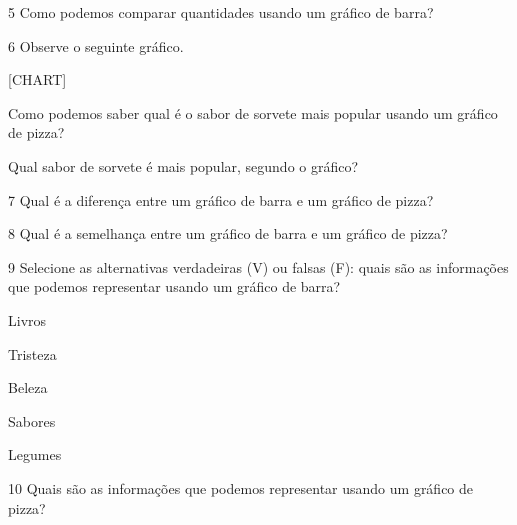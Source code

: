 

\num{5} Como podemos comparar quantidades usando um gráfico de barra?


\num{6} Observe o seguinte gráfico.

{{[}CHART{]}}

\begin{escolha}
\item Como podemos saber qual é o sabor de sorvete mais popular usando um
gráfico de pizza?



\item Qual sabor de sorvete é mais popular, segundo o gráfico?

\end{escolha}


\num{7} Qual é a diferença entre um gráfico de barra e um gráfico de pizza?



\num{8} Qual é a semelhança entre um gráfico de barra e um gráfico de
pizza?



\num{9} Selecione as alternativas verdadeiras (V) ou falsas (F): quais são
as informações que podemos representar usando um gráfico de barra?

\begin{boxlist}
\item Livros 

\item Tristeza 

\item Beleza 

\item Sabores 

\item Legumes 
\end{boxlist}

\num{10} Quais são as informações que podemos representar usando um gráfico
de pizza?


